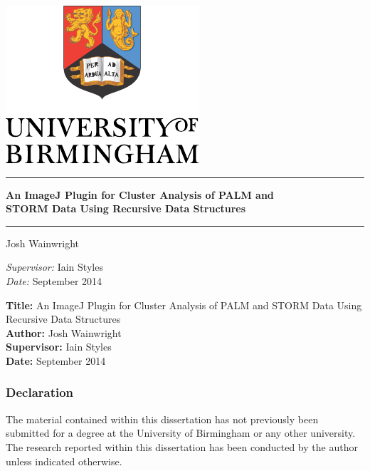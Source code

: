 
\begin{titlepage}
	\begin{center}
		\vspace*{\fill}

		\centering
		\includegraphics[scale=1.3]{Logo.pdf}
		\vfill

		\hrule
		{\LARGE\bf An ImageJ Plugin for Cluster Analysis of PALM and \\
		STORM Data Using Recursive Data Structures \\[0.4cm]}
		\hrule

		\vfill
		{\Large Josh Wainwright}
		\vfill

		\vfill
		\textit{Supervisor:} Iain Styles \\
		\vfill
		\textit{Date:} September 2014
		\vfill
		\vfill

	\end{center}
\end{titlepage}
\restoregeometry%

\thispagestyle{empty}

\textbf{Title:} An ImageJ Plugin for Cluster Analysis of PALM and STORM Data
Using Recursive Data Structures \\
\textbf{Author:} Josh Wainwright \\
\textbf{Supervisor:} Iain Styles \\
\textbf{Date:} September 2014 \\
\textbf{}
\vfill
\vfill

\subsubsection*{Declaration}

The material contained within this dissertation has not previously been
submitted for a degree at the University of Birmingham or any other university.
The research reported within this dissertation has been conducted by the author
unless indicated otherwise.\\

